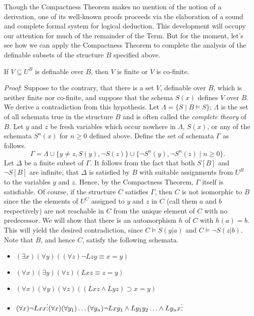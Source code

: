 Though the Compactness Theorem makes no mention of the notion of a derivation, one of its well-known proofs proceeds via the elaboration of a sound and complete formal system for logical deduction. This development will occupy our attention for much of the remainder of the Term. But for the moment, let's see how we can apply the Compactness Theorem to complete the analysis of the definable subsets of the structure $B$ specified above.
\begin{theorem}
If $V\subseteq U^B$ is definable over $B$, then $V$ is finite or $V$ is co-finite.
\end{theorem}
\emph{Proof}:
Suppose to the contrary, that there is a set $V$, definable over $B$, which is neither finite nor co-finite, and suppose that the schema $S(x)$ defines $V$ over $B$.  We derive a contradiction from this hypothesis.
Let $\Lambda = \{ S\mid B\models S\}$; $\Lambda$ is the set of all schemata true in the structure $B$ and is often called the \emph{complete theory} of $B$. Let $y$ and $z$ be fresh variables which occur nowhere in $\Lambda$, $S(x)$, or any of the schemata $S^n(x)$ for $n\geq 0$ defined above. Define the set of schemata $\Gamma$ as follows.
\[
\Gamma = \Lambda\cup\{y\neq z,S(y),\neg S(z)\}\cup\{\neg S^n(y),\neg S^n(z)\mid n\geq 0\}.
\]
Let $\Delta$ be a finite subset of $\Gamma$. It follows from the fact that both $S[B]$ and $\neg S[B]$ are infinite, that $\Delta$ is satisfied by $B$ with suitable assignments from $U^B$ to the variables $y$ and $z$. Hence, by the Compactness Theorem, $\Gamma$ itself is satisfiable. Of course, if the structure $C$ satisfies $\Gamma$, then $C$ is not isomorphic to $B$ since the the elements of $U^C$ assigned to $y$ and $z$ in $C$ (call them $a$ and $b$ respectively) are not reachable in $C$ from the unique element of $C$ with no predecessor. We will show that there is an automorphism $h$ of $C$ with $h(a)=b$. This will yield the desired  contradiction, since $C\models S(y|a)$ and $C\models \neg S(z|b)$. Note that $B$, and hence $C$, satisfy the following schemata.
\begin{itemize}
\item
$(\exists x)(\forall y)((\forall z)\neg Lzy \equiv x=y)$
\item
$(\forall x)(\exists y)(\forall z)(Lxz\equiv z=y)$
\item
$(\forall x)(\forall y)(\forall z)((Lxz\wedge Lyz)\supset x=y)$
\item
$(\forall x)\neg Lxx\\
\vdots\\
(\forall x)(\forall y_1)\ldots(\forall y_n)\neg Lxy_1\wedge Ly_1y_2\ldots\wedge Ly_nx\\
\vdots$
\end{itemize} 
